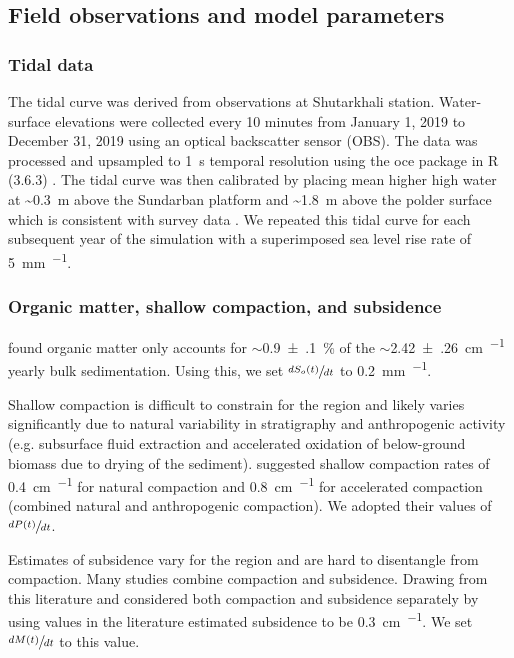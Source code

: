 \subsection{Field observations and model parameters}

\bigskip

\subsubsection*{Tidal data}

The tidal curve was derived from observations at Shutarkhali station. Water-surface elevations were collected every 10 minutes from January 1, 2019 to December 31, 2019 using an optical backscatter sensor (OBS). The data was processed and upsampled to \SI{1}{\second} temporal resolution using the oce package in R (3.6.3) \citep{kelleyOceAnalysisOceanographic2020}. The tidal curve was then calibrated by placing mean higher high water at \SI{~0.3}{\meter} above the Sundarban platform and \SI{~1.8}{\meter} above the polder surface which is consistent with survey data \citep{auerbachFloodRiskNatural2015,haleSeasonalVariabilityForces2019,bomerSurfaceElevationSedimentation2020}. We repeated this tidal curve for each subsequent year of the simulation with a superimposed sea level rise rate of \SI{5}{\milli\meter\per\year}.

\subsubsection*{Organic matter, shallow compaction, and subsidence}

\citet{bomerProcessControlsLive2020} found organic matter only accounts for $\sim$\SI{0.9(1)}{\percent} of the $\sim$\SI{2.42(26)}{\centi\meter\per\year} yearly bulk sedimentation. Using this, we set $\sfrac{dS_o(t)}{dt}$ to \SI{0.2}{\milli\meter\per\year}.

Shallow compaction is difficult to constrain for the region and likely varies significantly due to natural variability in stratigraphy and anthropogenic activity (e.g. subsurface fluid extraction and accelerated oxidation of below-ground biomass due to drying of the sediment). \citet{auerbachFloodRiskNatural2015} suggested shallow compaction rates of \SI{0.4}{\centi\meter\per\year} for natural compaction and \SI{0.8}{\centi\meter\per\year} for accelerated compaction (combined natural and anthropogenic compaction). We adopted their values of $\sfrac{dP(t)}{dt}$.

Estimates of subsidence vary for the region and are hard to disentangle from compaction. Many studies \citep{pethickRapidRiseEffective2013,goodbredSignificanceLargeSediment2000,stanleyHoloceneDepositionalPatterns2000} combine compaction and subsidence. Drawing from this literature and \citet{auerbachFloodRiskNatural2015} considered both compaction and subsidence separately by using values in the literature \citep{pethickRapidRiseEffective2013,goodbredSignificanceLargeSediment2000,stanleyHoloceneDepositionalPatterns2000} estimated subsidence to be \SI{0.3}{\centi\meter\per\year}. We set $\sfrac{dM(t)}{dt}$ to this value.

